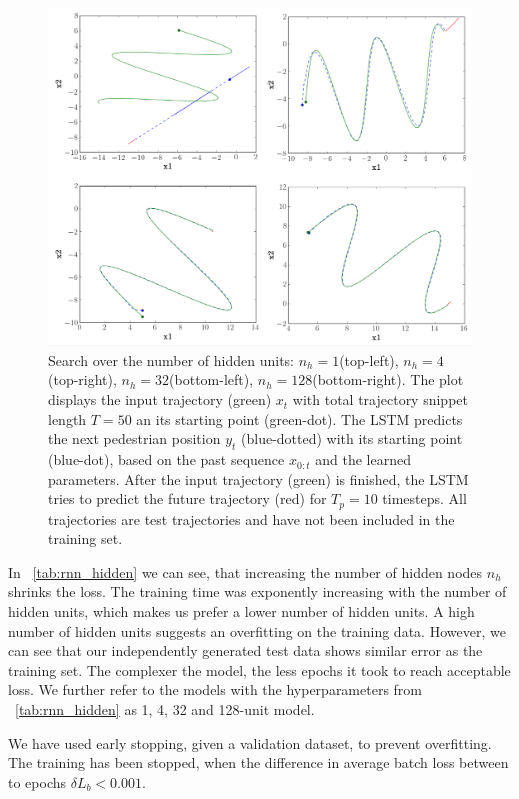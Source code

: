 \begin{figure}
	\centering
	\includegraphics [trim=0 0 0 0, clip, angle=0, width=1.0\columnwidth,
	keepaspectratio]{figures/rnn_hidden}
	\caption{Search over the number of hidden units: $n_h=1$(top-left), $n_h=4$(top-right), $n_h=32$(bottom-left), $n_h=128$(bottom-right). The plot displays the input trajectory (green) $x_t$ with total trajectory snippet length $T=50$ an its starting point (green-dot). The LSTM predicts the next pedestrian position $y_t$ (blue-dotted) with its starting point (blue-dot), based on the past sequence $x_{0:t}$ and the learned parameters. After the input trajectory (green) is finished, the LSTM tries to predict the future trajectory (red) for $T_p=10$ timesteps. All trajectories are test trajectories and have not been included in the training set.}
	\label{fig:rnn_hidden}
\end{figure}

In ~\cref{tab:rnn_hidden} we can see, that increasing the number of hidden nodes $n_h$ shrinks the loss. The training time was exponently increasing with the number of hidden units, which makes us prefer a lower number of hidden units. A high number of hidden units suggests an overfitting on the training data. However, we can see that our independently generated test data shows similar error as the training set. The complexer the model, the less epochs it took to reach acceptable loss. We further refer to the models with the hyperparameters from ~\cref{tab:rnn_hidden} as 1, 4, 32 and 128-unit model.

We have used early stopping, given a validation dataset, to prevent overfitting. The training has been stopped, when the difference in average batch loss between to epochs $\delta L_b < 0.001$.


